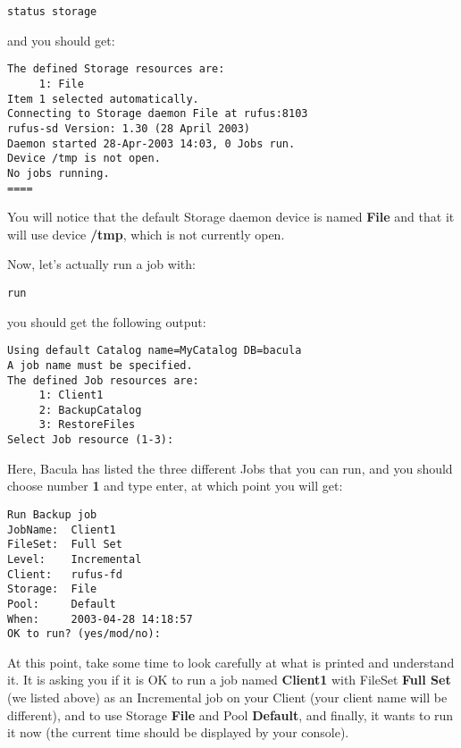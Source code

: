\footnotesize
\begin{verbatim}
status storage
\end{verbatim}
\normalsize

and you should get: 

\footnotesize
\begin{verbatim}
The defined Storage resources are:
     1: File
Item 1 selected automatically.
Connecting to Storage daemon File at rufus:8103
rufus-sd Version: 1.30 (28 April 2003)
Daemon started 28-Apr-2003 14:03, 0 Jobs run.
Device /tmp is not open.
No jobs running.
====
\end{verbatim}
\normalsize

You will notice that the default Storage daemon device is named {\bf File} and
that it will use device {\bf /tmp}, which is not currently open. 

Now, let's actually run a job with: 

\footnotesize
\begin{verbatim}
run
\end{verbatim}
\normalsize

you should get the following output: 

\footnotesize
\begin{verbatim}
Using default Catalog name=MyCatalog DB=bacula
A job name must be specified.
The defined Job resources are:
     1: Client1
     2: BackupCatalog
     3: RestoreFiles
Select Job resource (1-3):
\end{verbatim}
\normalsize

Here, Bacula has listed the three different Jobs that you can run, and you
should choose number {\bf 1} and type enter, at which point you will get: 

\footnotesize
\begin{verbatim}
Run Backup job
JobName:  Client1
FileSet:  Full Set
Level:    Incremental
Client:   rufus-fd
Storage:  File
Pool:     Default
When:     2003-04-28 14:18:57
OK to run? (yes/mod/no):
\end{verbatim}
\normalsize

At this point, take some time to look carefully at what is printed and
understand it. It is asking you if it is OK to run a job named {\bf Client1}
with FileSet {\bf Full Set} (we listed above) as an Incremental job on your
Client (your client name will be different), and to use Storage {\bf File} and
Pool {\bf Default}, and finally, it wants to run it now (the current time
should be displayed by your console). 

